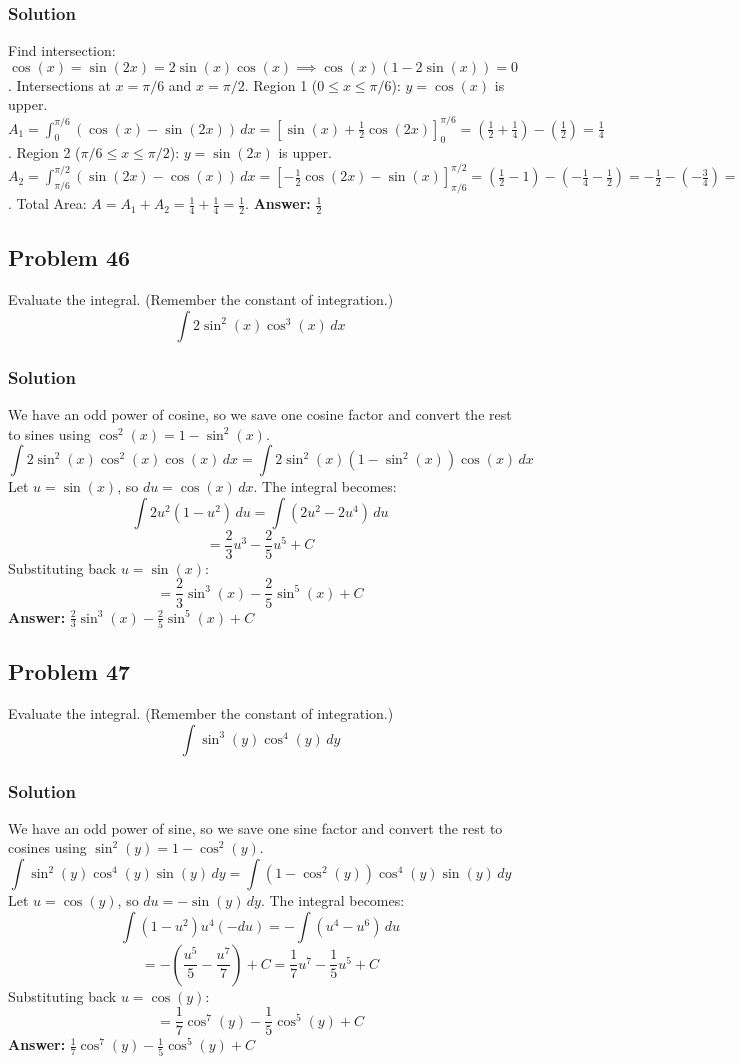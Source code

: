 \documentclass{article}
\begin{document}
\subsubsection*{Solution}
Find intersection: $\cos(x) = \sin(2x) = 2\sin(x)\cos(x) \implies \cos(x)(1 - 2\sin(x)) = 0$. Intersections at $x = \pi/6$ and $x = \pi/2$.
Region 1 ($0 \le x \le \pi/6$): $y=\cos(x)$ is upper. $A_1 = \int_{0}^{\pi/6} (\cos(x) - \sin(2x)) \,dx = [\sin(x) + \frac{1}{2}\cos(2x)]_0^{\pi/6} = (\frac{1}{2} + \frac{1}{4}) - (\frac{1}{2}) = \frac{1}{4}$.
Region 2 ($\pi/6 \le x \le \pi/2$): $y=\sin(2x)$ is upper. $A_2 = \int_{\pi/6}^{\pi/2} (\sin(2x) - \cos(x)) \,dx = [-\frac{1}{2}\cos(2x) - \sin(x)]_{\pi/6}^{\pi/2} = (\frac{1}{2} - 1) - (-\frac{1}{4} - \frac{1}{2}) = -\frac{1}{2} - (-\frac{3}{4}) = \frac{1}{4}$.
Total Area: $A = A_1 + A_2 = \frac{1}{4} + \frac{1}{4} = \frac{1}{2}$.
\textbf{Answer:} $ \frac{1}{2} $
\subsection{Problem 46}
Evaluate the integral. (Remember the constant of integration.)
$$ \int 2 \sin^2(x) \cos^3(x) \,dx $$
\subsubsection*{Solution}
We have an odd power of cosine, so we save one cosine factor and convert the rest to sines using $\cos^2(x) = 1 - \sin^2(x)$.
$$ \int 2 \sin^2(x) \cos^2(x) \cos(x) \,dx = \int 2 \sin^2(x) (1 - \sin^2(x)) \cos(x) \,dx $$
Let $u = \sin(x)$, so $du = \cos(x) \,dx$. The integral becomes:
$$ \int 2 u^2 (1 - u^2) \,du = \int (2u^2 - 2u^4) \,du $$
$$ = \frac{2}{3}u^3 - \frac{2}{5}u^5 + C $$
Substituting back $u = \sin(x)$:
$$ = \frac{2}{3}\sin^3(x) - \frac{2}{5}\sin^5(x) + C $$
\textbf{Answer:} $ \frac{2}{3}\sin^3(x) - \frac{2}{5}\sin^5(x) + C $
\subsection{Problem 47}
Evaluate the integral. (Remember the constant of integration.)
$$ \int \sin^3(y) \cos^4(y) \,dy $$
\subsubsection*{Solution}
We have an odd power of sine, so we save one sine factor and convert the rest to cosines using $\sin^2(y) = 1 - \cos^2(y)$.
$$ \int \sin^2(y) \cos^4(y) \sin(y) \,dy = \int (1 - \cos^2(y)) \cos^4(y) \sin(y) \,dy $$
Let $u = \cos(y)$, so $du = -\sin(y) \,dy$. The integral becomes:
$$ \int (1 - u^2) u^4 (-du) = -\int (u^4 - u^6) \,du $$
$$ = - \left( \frac{u^5}{5} - \frac{u^7}{7} \right) + C = \frac{1}{7}u^7 - \frac{1}{5}u^5 + C $$
Substituting back $u = \cos(y)$:
$$ = \frac{1}{7}\cos^7(y) - \frac{1}{5}\cos^5(y) + C $$
\textbf{Answer:} $ \frac{1}{7}\cos^7(y) - \frac{1}{5}\cos^5(y) + C $
\end{document}
